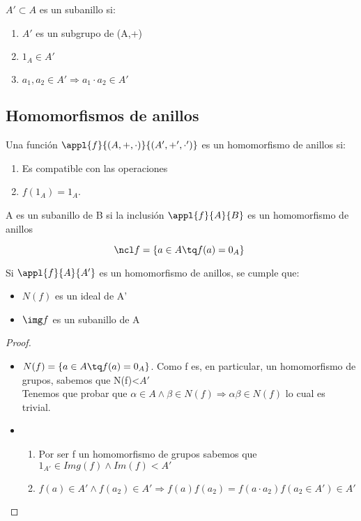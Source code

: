 \documentclass[nochap]{apuntes}
\begin{document}
\begin{defn}[Subanillo]
 $A'\subset A$  es un subanillo si:
 \begin{enumerate}
  \item $A'$  es un subgrupo de (A,+)
  \item $1_A \in A'$
  \item $a_1, a_2 \in A' \Rightarrow a_1\cdot a_2 \in A'$
 \end{enumerate}
\end{defn}


\subsection{Homomorfismos de anillos}
\begin{defn}
Una función $\appl{f}{(A,+,\cdot)}{(A', +', \cdot')}$  es un homomorfismo de anillos si:
\begin{enumerate}
 \item Es compatible con las operaciones
 \item $f(1_A)=1_A$.
\end{enumerate}
\end{defn}

\begin{lemma}
 A es un subanillo de B si la inclusión $\appl{f}{A}{B}$  es un homomorfismo de anillos
\end{lemma}

\begin{defn}
\[ \ncl f =\{a \in A \tq f(a)=0_A\} \]
\end{defn}

\begin{lemma}
 Si $\appl{f}{A}{A'}$  es un homomorfismo de anillos, se cumple que:
 \begin{itemize}
  \item $N(f)$ es un ideal de A'
  \item $\img f$ es un subanillo de A
 \end{itemize}
\end{lemma}

\begin{proof}
 \begin{itemize}
  \item $N(f)=\{a \in A \tq f(a)=0_A\}$.
  Como f es, en particular, un homomorfismo de grupos, sabemos que N(f)<$A'$ \\
  Tenemos que probar que $\alpha \in A \wedge \beta \in N(f) \Rightarrow \alpha\beta \in N(f)$  lo cual es trivial.
  \item \begin{enumerate}
         \item Por ser f un homomorfismo de grupos sabemos que $1_{A'} \in Img(f) \wedge Im(f)<A'$
         \item $f(a)\in A' \wedge f(a_2)\in A' \Rightarrow f(a)f(a_2)=f(a\cdot a_2)f(a_2\in A')\in A'$
        \end{enumerate}
 \end{itemize}
\end{proof}
\end{document}
